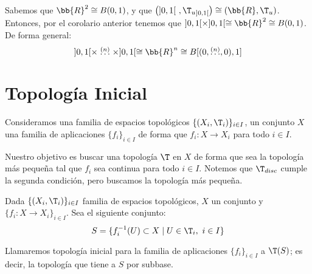 \begin{ejemplo}
    Sabemos que $\bb{R}^2 \cong B(0,1)$, y que $\left(]0,1[~,{\T_u}_{]0,1[}\right)\cong (\bb{R},\T_u)$. Entonces, por el corolario anterior tenemos que $]0,1[\times ]0,1[ \cong \bb{R}^2 \cong B(0,1)$. De forma general:
    \begin{equation*}
        ]0,1[ \times \stackrel{(n)}{\dots} \times ]0,1[ \cong \bb{R}^n \cong B[(0,  \stackrel{(n)}{\dots}, 0), 1]
    \end{equation*}
\end{ejemplo}


\section{Topología Inicial}
Consideramos una familia de espacios topológicos $\{(X_i,\T_i)\}_{i\in I}$, un conjunto $X$ una familia de aplicaciones $\{f_i\}_{i\in I}$ de forma que $f_i:X\to X_i$ para todo $i\in I$.

Nuestro objetivo es buscar una topología $\T$ en $X$ de forma que sea la topología más pequeña tal que $f_i$ sea continua para todo $i\in I$. Notemos que $\T_{disc}$ cumple la segunda condición, pero buscamos la topología más pequeña.


\begin{definicion}
    Dada $\{(X_i,\T_i)\}_{i\in I}$ familia de espacios topológicos, $X$ un conjunto y $\{f_i:X\to X_i\}_{i\in I}$. Sea el siguiente conjunto:
    $$S=\{f_i^{-1}(U)\subset X\mid U\in \T_i,~ i\in I\}$$

    Llamaremos topología inicial para la familia de aplicaciones $\{f_i\}_{i\in I}$ a $\T(S)$; es decir, la topología que tiene a $S$ por subbase.
\end{definicion}

